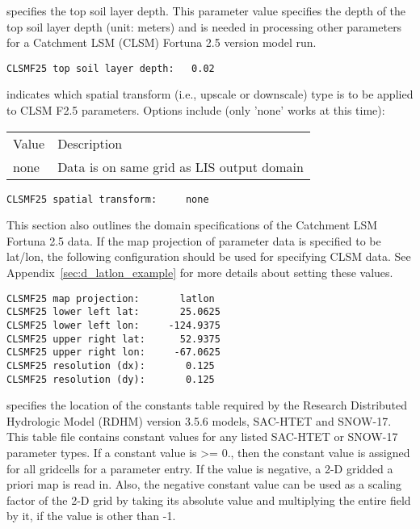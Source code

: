  
  specifies the top soil layer
 depth.  This parameter value specifies the depth of the top soil
 layer depth (unit: meters) and is needed in processing other
 parameters for a Catchment LSM (CLSM) Fortuna 2.5 version model run.
 

 \begin{Verbatim}[frame=single]
CLSMF25 top soil layer depth:   0.02 
 \end{Verbatim}

 
  indicates which spatial transform
 (i.e., upscale or downscale) type is to be applied to CLSM F2.5
 parameters.
 Options include (only 'none' works at this time):

 \begin{tabular}{ll}
 Value   & Description                  \\
 none    &  Data is on same grid as LIS output domain \\
 \end{tabular}
 
 \begin{Verbatim}[frame=single]
CLSMF25 spatial transform:     none
 \end{Verbatim}

 
 This section also outlines the domain specifications of the
 Catchment LSM Fortuna 2.5 data.
 If the map projection of parameter data is specified to be lat/lon,
 the following configuration should be used for specifying CLSM data.
 See Appendix~\ref{sec:d_latlon_example} for more details about
 setting these values.
 
 \begin{Verbatim}[frame=single]
CLSMF25 map projection:       latlon
CLSMF25 lower left lat:       25.0625
CLSMF25 lower left lon:     -124.9375
CLSMF25 upper right lat:      52.9375
CLSMF25 upper right lon:     -67.0625
CLSMF25 resolution (dx):       0.125
CLSMF25 resolution (dy):       0.125
 \end{Verbatim}

 
  specifies the location of
  the constants table required by the Research Distributed 
  Hydrologic Model (RDHM) version 3.5.6 models, SAC-HTET and SNOW-17.
  This table file contains constant values for any listed SAC-HTET
  or SNOW-17 parameter types.  If a constant value is >= 0., then
  the constant value is assigned for all gridcells for a parameter entry.
  If the value is negative, a 2-D gridded a priori map is read in.
  Also, the negative constant value can be used as a scaling factor
  of the 2-D grid by taking its absolute value and multiplying the
  entire field by it, if the value is other than -1.

